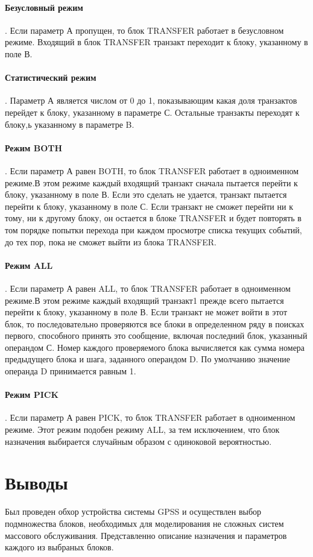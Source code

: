 \paragraph{Безусловный режим}. Если параметр А пропущен, то блок TRANSFER работает в безусловном режиме. Входящий в блок TRANSFER транзакт переходит к блоку, указанному в поле В.

\paragraph{Статистический режим}. Параметр А является числом от 0 до 1, показывающим какая доля транзактов перейдет к блоку, указанному в параметре С. Остальные транзакты переходят к блоку,ь указанному в параметре B.

\paragraph{Режим BOTH}. Если параметр А равен BOTH, то блок TRANSFER работает в одноименном режиме.В этом режиме каждый входящий транзакт сначала пытается перейти к блоку, указанному в поле В. Если это сделать не удается, транзакт пытается перейти к блоку, указанному в поле С. Если транзакт не сможет перейти ни к тому, ни к другому блоку, он остается в блоке TRANSFER и будет повторять в том порядке попытки перехода при каждом просмотре списка текущих событий, до тех пор, пока не сможет выйти из блока TRANSFER.

\paragraph{Режим ALL}. Если параметр А равен ALL, то блок TRANSFER работает в одноименном режиме.В этом режиме каждый входящий транзакт1 прежде всего пытается перейти к блоку, указанному в поле В. Если транзакт не может войти в этот блок, то последовательно проверяются все блоки в определенном ряду в поисках первого, способного принять это сообщение, включая последний блок, указанный операндом С. Номер каждого проверяемого блока вычисляется как сумма номера предыдущего блока и шага, заданного операндом D. По умолчанию значение операнда D принимается равным 1.

\paragraph{Режим PICK}. Если параметр А равен PICK, то блок TRANSFER работает в одноименном режиме. Этот режим подобен режиму ALL, за тем исключением, что блок назначения выбирается случайным образом с одиноковой вероятностью.

\section{Выводы}

Был проведен обхор устройства системы GPSS и осуществлен выбор подмножества блоков, необходимых для моделирования не сложных систем массового обслуживания. Представленно описание назначения и параметров каждого из выбраных блоков.
